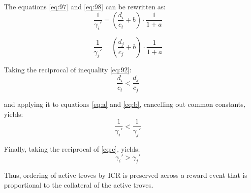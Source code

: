 \documentclass[reqno]{article}
\begin{document}
The equations \ref{eq:97} and \ref{eq:98} can be rewritten as:
\begin{equation} \label{eq:a}
  \frac{1}{\gamma_i'} = \left(\frac{d_i}{c_i}+b\right) \cdot \frac{1}{1 + a}  
\end{equation}

\begin{equation} \label{eq:b}
  \frac{1}{\gamma_j'} = \left(\frac{d_j}{c_j}+b\right) \cdot \frac{1}{1 + a}  
\end{equation}

Taking the reciprocal of inequality \ref{eq:92}:
\begin{equation}
  \frac{d_i}{c_i} < \frac{d_j}{c_j}
\end{equation}

and applying it to equations \ref{eq:a} and \ref{eq:b}, cancelling out common constants, yields:
\begin{equation} \label{eq:c}
  \frac{1}{\gamma_i'} < \frac{1}{\gamma_j'}
\end{equation}

Finally, taking the reciprocal of \ref{eq:c}, yields:
\begin{equation}
  \gamma_i' > \gamma_j'
\end{equation}

Thus, ordering of active troves by ICR is preserved across a reward event that is proportional to the collateral of the active troves.
\end{document}
